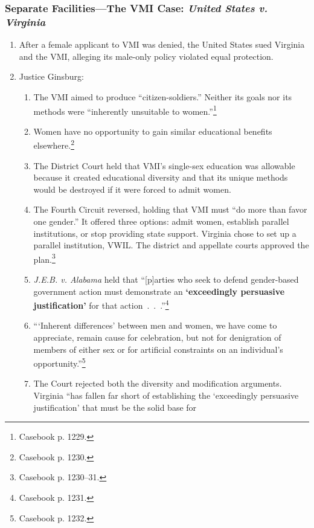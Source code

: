 \subsubsection{Separate Facilities---The VMI Case: \emph{United States v. 
Virginia}}

\begin{enumerate}
    \item After a female applicant to VMI was denied, the United States sued 
    Virginia and the VMI, alleging its male-only policy violated equal 
    protection.
    \item Justice Ginsburg:
    \begin{enumerate}
        \item The VMI aimed to produce ``citizen-soldiers.'' Neither its goals 
        nor its methods were ``inherently unsuitable to 
        women.''\footnote{Casebook p. 1229.}
        \item Women have no opportunity to gain similar educational benefits 
        elsewhere.\footnote{Casebook p. 1230.}
        \item The District Court held that VMI's single-sex education was 
        allowable because it created educational diversity and that its unique 
        methods would be destroyed if it were forced to admit women.
        \item The Fourth Circuit reversed, holding that VMI must ``do more 
        than favor one gender.'' It offered three options: admit women, 
        establish parallel institutions, or stop providing state support. 
        Virginia chose to set up a parallel institution, VWIL. The district 
        and appellate courts approved the plan.\footnote{Casebook p. 1230--31.}
        \item \emph{J.E.B. v. Alabama} held that ``[p]arties who seek to 
        defend gender-based government action must demonstrate an 
        \textbf{`exceedingly persuasive justification'} for that 
        action~.~.~.''\footnote{Casebook p. 1231.}
        \item ```Inherent differences' between men and women, we have come to 
        appreciate, remain cause for celebration, but not for denigration of 
        members of either sex or for artificial constraints on an individual's 
        opportunity.''\footnote{Casebook p. 1232.}
        \item The Court rejected both the diversity and modification 
        arguments. Virginia ``has fallen far short of establishing the 
        `exceedingly persuasive justification' that must be the solid base for 

\end{enumerate}
\end{enumerate}
